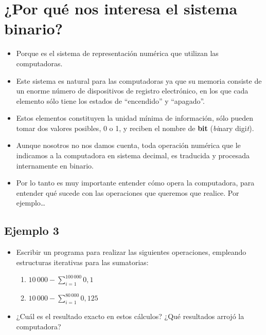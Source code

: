 \documentclass[openany]{book}
\providecommand{\tightlist}{%
  \setlength{\itemsep}{0pt}\setlength{\parskip}{0pt}}
\begin{document}
\hypertarget{por-quuxe9-nos-interesa-el-sistema-binario}{%
\section{¿Por qué nos interesa el sistema binario?}\label{por-quuxe9-nos-interesa-el-sistema-binario}}

\begin{itemize}
\tightlist
\item
  Porque es el sistema de representación numérica que utilizan las computadoras.
\item
  Este sistema es natural para las computadoras ya que su memoria consiste de un enorme número de dispositivos de registro electrónico, en los que cada elemento sólo tiene los estados de ``encendido'' y ``apagado''.
\item
  Estos elementos constituyen la unidad mínima de información, sólo pueden tomar dos valores posibles, 0 o 1, y reciben el nombre de \textbf{bit} (\emph{bi}nary digi\emph{t}).
\item
  Aunque nosotros no nos damos cuenta, toda operación numérica que le indicamos a la computadora en sistema decimal, es traducida y procesada internamente en binario.
\item
  Por lo tanto es muy importante entender cómo opera la computadora, para entender qué sucede con las operaciones que queremos que realice. Por ejemplo\ldots{}
\end{itemize}

\hypertarget{ejemplo-3}{%
\subsection{Ejemplo 3}\label{ejemplo-3}}

\begin{itemize}
\item
  Escribir un programa para realizar las siguientes operaciones, empleando estructuras iterativas para las sumatorias:

  \begin{enumerate}
  \def\labelenumi{\alph{enumi})}
  \tightlist
  \item
    \(10 \, 000 - \sum_{i=1}^{100 \, 000} 0,1\)
  \item
    \(10 \, 000 - \sum_{i=1}^{80 \, 000} 0,125\)
  \end{enumerate}
\item
  ¿Cuál es el resultado exacto en estos cálculos? ¿Qué resultados arrojó la computadora?
\end{itemize}
\end{document}
